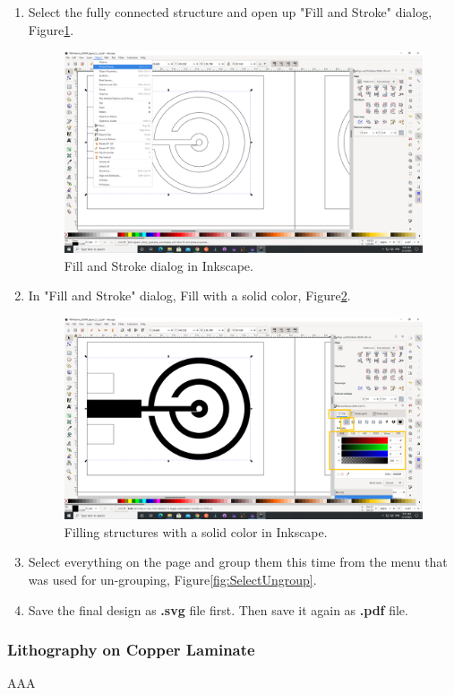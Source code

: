 \begin{enumerate}
	\item Select the fully connected structure and open up "Fill and Stroke" dialog, Figure\ref{fig:FillAndStroke}. 

	\begin{figure}[H]
		\centering
		\includegraphics[angle=0,origin=c,width = .8\linewidth]{Section_ODMR_Antenna/Figures/FillAndStroke.png}
		\caption{Fill and Stroke dialog in Inkscape.}
		\label{fig:FillAndStroke}
	\end{figure}
	
	\item In "Fill and Stroke" dialog, Fill with a solid color, Figure\ref{fig:FillSolidColor}. 

	\begin{figure}[H]
		\centering
		\includegraphics[angle=0,origin=c,width = .8\linewidth]{Section_ODMR_Antenna/Figures/FillSolidColor.png}
		\caption{Filling structures with a solid color in Inkscape.}
		\label{fig:FillSolidColor}
	\end{figure}
	
	\item Select everything on the page and group them this time from the menu that was used for
	un-grouping, Figure\ref{fig:SelectUngroup}.
	
	\item Save the final design as \textbf{.svg} file first. Then save it again as \textbf{.pdf} file.
\end{enumerate}



\subsubsection{Lithography on Copper Laminate}

AAA
